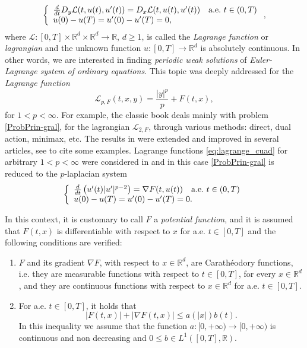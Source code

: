 \documentclass[twoside]{article}
\makeatletter
\theoremstyle{remark}
\newcommand{\labitem}[2]{%
\def\@itemlabel{\textbf{#1}}
\item
\def\@currentlabel{#1}\label{#2}}
\newcommand{\rr}{\mathbb{R}}
\renewcommand{\leq}{\leqslant}
\renewcommand{\geq}{\geqslant}
\newcounter{example}
\makeatother
\begin{document}
\begin{equation}\label{ProbPrin-gral}
    \left\{%
\begin{array}{ll}
  \frac{d}{dt} D_{y}\mathcal{L}(t,u(t),u'(t))= D_{x}\mathcal{L}(t,u(t),u'(t)) \quad \hbox{a.e.}\ t \in (0,T)\\
    u(0)-u(T)=u'(0)-u'(T)=0,
\end{array}%
\right.,
\end{equation}
where $\mathcal{L}:[0,T]\times\rr^d\times\rr^d\to\rr$, $d\geq 1$, is called the \emph{Lagrange function} or \emph{lagrangian} and the unknown function  $u:[0,T]\to\rr^d$ is absolutely continuous. In other words, we are interested in  finding \emph{periodic weak solutions} of \emph{Euler-Lagrange system of ordinary equations}. This topic was deeply addressed for the \emph{Lagrange function}
\begin{equation}\label{eq:lagrange_cuad}
\mathcal{L}_{p,F}(t,x,y)=\frac{|y|^p}{p}+F(t,x),
\end{equation}
for $1<p<\infty$. For example, the classic book  \cite{mawhin2010critical} deals mainly with problem \eqref{ProbPrin-gral}, for the lagrangian $\mathcal{L}_{2,F}$, through various methods: direct, dual action, minimax, etc. The results in \cite{mawhin2010critical} were extended and improved in several articles, see  \cite{tang1995periodic,tang1998periodic,wu1999periodic,tang2001periodic,zhao2004periodic}  to cite some examples. Lagrange functions \eqref{eq:lagrange_cuad} for arbitrary $1<p<\infty$ were considered in  \cite{Tian2007192,tang2010periodic} and in this case \eqref{ProbPrin-gral}  is reduced to the $p$-laplacian system
\begin{equation}\label{ProbP-lapla}
    \left\{%
\begin{array}{ll}
   \frac{d}{dt}\left(u'(t)|u'|^{p-2}\right) = \nabla F(t,u(t)) \quad \hbox{a.e.}\ t \in (0,T)\\
    u(0)-u(T)=u'(0)-u'(T)=0.
\end{array}%
\right.
\end{equation}


In this context, it  is customary to call $F$ a  \emph{potential function}, and it is assumed that $F(t,x)$ is differentiable with respect to $x$ for a.e. $t\in [0,T]$ and the following conditions are verified:
\begin{enumerate}
\labitem{(C)}{item:condicion_c} $F$ and its gradient $\nabla F$, with respect to $x\in\rr^d$,  are  Carath\'eodory functions, i.e. they are measurable functions with respect to $t\in [0,T]$, for every  $x\in\rr^d$, and they are continuous functions with  respect to  $x\in\rr^d$ for a.e. $t \in [0,T]$.
 \labitem{(A)}{item:condicion_a}  For   a.e. $t\in [0,T]$, it holds that
\begin{equation}
|F(t,x)| + |\nabla F(t,x)|  \leq a(|x|)b(t).
\end{equation}
In this inequality we assume that the function  $a:[0,+\infty)\to [0,+\infty)$ is continuous and non decreasing and $0\leq b\in L^1([0,T],\rr)$.
\end{enumerate}
\end{document}
